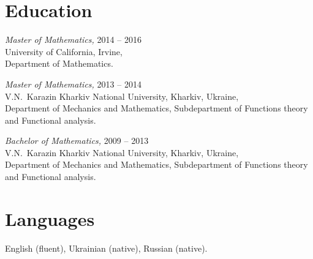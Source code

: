 \documentclass[margin, 10pt]{res} %
\begin{document}
\begin{resume}
\section{Education}
{\sl Master of Mathematics,} \hfill 2014 -- 2016\\
University of California, Irvine, \\
Department of Mathematics.

{\sl Master of Mathematics,} \hfill  2013 -- 2014\\
 V.N.\ Karazin Kharkiv National University, Kharkiv, Ukraine,\\
Department of Mechanics and Mathematics, Subdepartment 
of Functions theory and Functional analysis. 

{\sl Bachelor of Mathematics,} \hfill 2009 -- 2013\\
V.N.\ Karazin Kharkiv National University, Kharkiv, Ukraine,\\
Department of Mechanics and Mathematics, Subdepartment 
of Functions theory and Functional analysis.

\section{Languages}
English (fluent), Ukrainian (native), Russian (native).

\end{resume}
\end{document}
